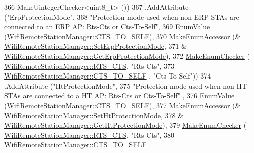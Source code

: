 \begin{DoxyCode}
366                    MakeUintegerChecker<uint8\_t> ())
367     .AddAttribute (\textcolor{stringliteral}{"ErpProtectionMode"},
368                    \textcolor{stringliteral}{"Protection mode used when non-ERP STAs are connected to an ERP AP: Rts-Cts or
       Cts-To-Self"},
369                    EnumValue (\hyperlink{classns3_1_1WifiRemoteStationManager_acd7d97851233efb176637f24b3f8abd6ad0c522321faed61b29adaf6638237a13}{WifiRemoteStationManager::CTS\_TO\_SELF}),
370                    \hyperlink{namespacens3_af5050739867ce63896dec011e332c8ec}{MakeEnumAccessor} (&
      \hyperlink{classns3_1_1WifiRemoteStationManager_abb4e4d7598af1c817e6361507c633f88}{WifiRemoteStationManager::SetErpProtectionMode},
371                                      &
      \hyperlink{classns3_1_1WifiRemoteStationManager_a016cd8bb1b82136991e86afa18883a8d}{WifiRemoteStationManager::GetErpProtectionMode}),
372                    \hyperlink{namespacens3_a48832781a2b521d3d0091e05ece30615}{MakeEnumChecker} (
      \hyperlink{classns3_1_1WifiRemoteStationManager_acd7d97851233efb176637f24b3f8abd6a9b13d2909729692abb397767e99edfd9}{WifiRemoteStationManager::RTS\_CTS}, \textcolor{stringliteral}{"Rts-Cts"},
373                                     \hyperlink{classns3_1_1WifiRemoteStationManager_acd7d97851233efb176637f24b3f8abd6ad0c522321faed61b29adaf6638237a13}{WifiRemoteStationManager::CTS\_TO\_SELF}
      , \textcolor{stringliteral}{"Cts-To-Self"}))
374     .AddAttribute (\textcolor{stringliteral}{"HtProtectionMode"},
375                    \textcolor{stringliteral}{"Protection mode used when non-HT STAs are connected to a HT AP: Rts-Cts or Cts-To-Self"}
      ,
376                    EnumValue (\hyperlink{classns3_1_1WifiRemoteStationManager_acd7d97851233efb176637f24b3f8abd6ad0c522321faed61b29adaf6638237a13}{WifiRemoteStationManager::CTS\_TO\_SELF}),
377                    \hyperlink{namespacens3_af5050739867ce63896dec011e332c8ec}{MakeEnumAccessor} (&
      \hyperlink{classns3_1_1WifiRemoteStationManager_afdcb8e121600316024ecb2eb7b3a477a}{WifiRemoteStationManager::SetHtProtectionMode},
378                                      &
      \hyperlink{classns3_1_1WifiRemoteStationManager_ab5b352c44142b3b0bd147b7acbd79b59}{WifiRemoteStationManager::GetHtProtectionMode}),
379                    \hyperlink{namespacens3_a48832781a2b521d3d0091e05ece30615}{MakeEnumChecker} (
      \hyperlink{classns3_1_1WifiRemoteStationManager_acd7d97851233efb176637f24b3f8abd6a9b13d2909729692abb397767e99edfd9}{WifiRemoteStationManager::RTS\_CTS}, \textcolor{stringliteral}{"Rts-Cts"},
380                                     \hyperlink{classns3_1_1WifiRemoteStationManager_acd7d97851233efb176637f24b3f8abd6ad0c522321faed61b29adaf6638237a13}{WifiRemoteStationManager::CTS\_TO\_SELF}

\end{DoxyCode}
